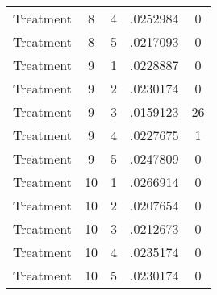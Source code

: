 \begin{tabular}{l*{4}{c}}
Treatment           &           8&           4&    .0252984&           0\\
Treatment           &           8&           5&    .0217093&           0\\
Treatment           &           9&           1&    .0228887&           0\\
Treatment           &           9&           2&    .0230174&           0\\
Treatment           &           9&           3&    .0159123&          26\\
Treatment           &           9&           4&    .0227675&           1\\
Treatment           &           9&           5&    .0247809&           0\\
Treatment           &          10&           1&    .0266914&           0\\
Treatment           &          10&           2&    .0207654&           0\\
Treatment           &          10&           3&    .0212673&           0\\
Treatment           &          10&           4&    .0235174&           0\\
Treatment           &          10&           5&    .0230174&           0\\
\hline\hline
\end{tabular}
